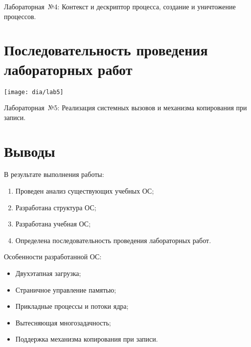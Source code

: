 \documentclass[12pt]{article}
\begin{document}
Лабораторная~№4: Контекст и дескриптор процесса, создание и уничтожение процессов.

\section{\textbf{Последовательность проведения лабораторных работ}}
\begin{center}
\texttt{[image: dia/lab5]}
\end{center}

Лабораторная~№5: Реализация системных вызовов и механизма копирования при записи.

\section{\textbf{Выводы}}
В результате выполнения работы:
\begin{enumerate}
\item Проведен анализ существующих учебных ОС;
\item Разработана структура ОС;
\item Разработана учебная ОС;
\item Определена последовательность проведения лабораторных работ.
\end{enumerate}

Особенности разработанной ОС:
\begin{itemize}
\item Двухэтапная загрузка;
\item Страничное управление памятью;
\item Прикладные процессы и потоки ядра;
\item Вытесняющая многозадачность;
\item Поддержка механизма копирования при записи.
\end{itemize}
\end{document}
